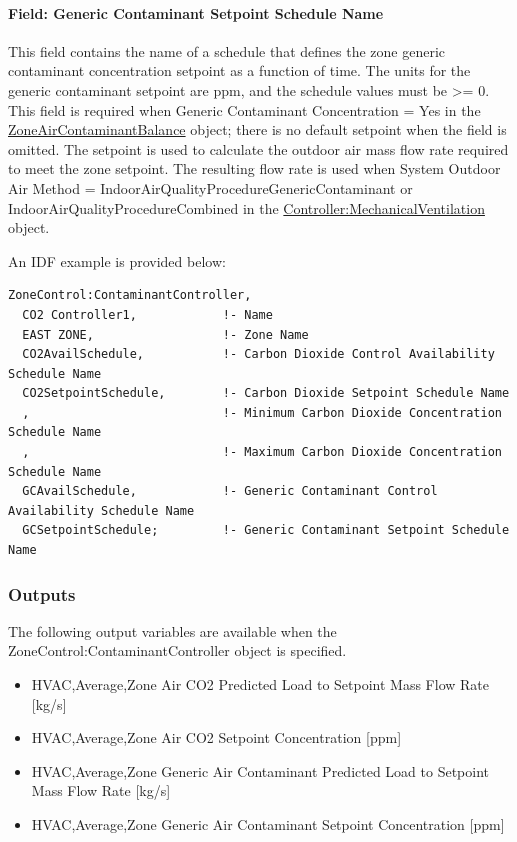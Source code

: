 \paragraph{Field: Generic Contaminant Setpoint Schedule Name}\label{field-generic-contaminant-setpoint-schedule-name}

This field contains the name of a schedule that defines the zone generic contaminant concentration setpoint as a function of time. The units for the generic contaminant setpoint are ppm, and the schedule values must be \textgreater{}= 0. This field is required when Generic Contaminant Concentration = Yes in the \hyperref[zoneaircontaminantbalance]{ZoneAirContaminantBalance} object; there is no default setpoint when the field is omitted. The setpoint is used to calculate the outdoor air mass flow rate required to meet the zone setpoint. The resulting flow rate is used when System Outdoor Air Method = IndoorAirQualityProcedureGenericContaminant or IndoorAirQualityProcedureCombined in the \hyperref[controllermechanicalventilation]{Controller:MechanicalVentilation} object.

An IDF example is provided below:

\begin{lstlisting}
ZoneControl:ContaminantController,
  CO2 Controller1,            !- Name
  EAST ZONE,                  !- Zone Name
  CO2AvailSchedule,           !- Carbon Dioxide Control Availability Schedule Name
  CO2SetpointSchedule,        !- Carbon Dioxide Setpoint Schedule Name
  ,                           !- Minimum Carbon Dioxide Concentration Schedule Name
  ,                           !- Maximum Carbon Dioxide Concentration Schedule Name
  GCAvailSchedule,            !- Generic Contaminant Control Availability Schedule Name
  GCSetpointSchedule;         !- Generic Contaminant Setpoint Schedule Name
\end{lstlisting}

\subsubsection{Outputs}\label{outputs-4-020}

The following output variables are available when the ZoneControl:ContaminantController object is specified.

\begin{itemize}
\item
  HVAC,Average,Zone Air CO2 Predicted Load to Setpoint Mass Flow Rate {[}kg/s{]}
\item
  HVAC,Average,Zone Air CO2 Setpoint Concentration {[}ppm{]}
\item
  HVAC,Average,Zone Generic Air Contaminant Predicted Load to Setpoint Mass Flow Rate {[}kg/s{]}
\item
  HVAC,Average,Zone Generic Air Contaminant Setpoint Concentration {[}ppm{]}
\end{itemize}

